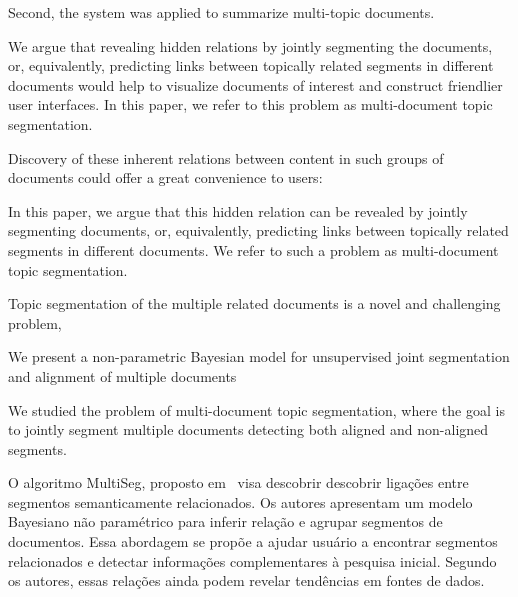 Second, the system was applied to summarize multi-topic documents.











We argue that revealing hidden
relations by jointly segmenting the documents, or, equivalently, 
predicting links between topically related segments in
different documents would help to visualize documents of interest 
and construct friendlier user interfaces. In this paper,
we refer to this problem as multi-document topic segmentation.




Discovery of these inherent relations between content in such
groups of documents could offer a great convenience to users:


In this paper, we argue that this hidden relation 
can be revealed by jointly segmenting documents, or,
equivalently, predicting links between topically related segments 
in different documents. We refer to such a problem
as multi-document topic segmentation.



Topic segmentation of the multiple related documents is
a novel and challenging problem,


We present a non-parametric Bayesian model for unsupervised 
joint segmentation and alignment of multiple documents


We studied the problem of multi-document topic segmentation, 
where the goal is to jointly segment multiple documents 
detecting both aligned and non-aligned segments.




O algoritmo MultiSeg, proposto em~\cite{} visa descobrir descobrir ligações entre segmentos semanticamente relacionados. Os autores apresentam um modelo Bayesiano não paramétrico para inferir relação e agrupar segmentos de documentos. Essa abordagem se propõe a ajudar usuário a encontrar segmentos relacionados e detectar informações complementares à pesquisa inicial. Segundo os autores, essas relações ainda podem revelar tendências em fontes de dados.





























